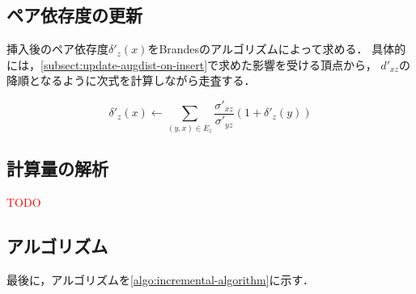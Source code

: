 \subsection{ペア依存度の更新}
\label{subsect:update-delta-on-insert}

挿入後のペア依存度$\delta'_z(x)$をBrandesのアルゴリズムによって求める．
具体的には，\ref{subsect:update-augdist-on-insert}で求めた影響を受ける頂点から，
$d'_{xz}$の降順となるように次式を計算しながら走査する．

\[ \delta'_{z}(x)\gets\sum_{(y,x)\in E_z}\frac{\sigma'_{xz}}{\sigma'_{yz}}(1+\delta'_z(y)) \]

\subsection{計算量の解析}
\label{subsect:computational-complexity-of-incremental-algorithm}
\textcolor{red}{TODO}

\subsection{アルゴリズム}
\label{subsect:incremental-algorithm}
最後に，アルゴリズムを\ref{algo:incremental-algorithm}に示す．

